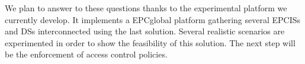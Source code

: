 \documentclass[a4paper]{llncs}
\begin{document}
We plan to answer to these questions thanks to the experimental platform we currently develop. It
implements a EPCglobal platform gathering several EPCISs and DSs interconnected using the last
solution. Several realistic scenarios are experimented in order to show the feasibility of this
solution.
The next step will be the enforcement of access control policies.

\end{document}
